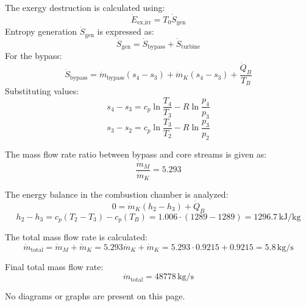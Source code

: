 The exergy destruction is calculated using:  
\[
\dot{E}_{\text{ex,irr}} = T_0 \dot{S}_{\text{gen}}
\]  
Entropy generation \( \dot{S}_{\text{gen}} \) is expressed as:  
\[
\dot{S}_{\text{gen}} = \dot{S}_{\text{bypass}} + \dot{S}_{\text{turbine}}
\]  
For the bypass:  
\[
\dot{S}_{\text{bypass}} = \dot{m}_{\text{bypass}} (s_4 - s_3) + \dot{m}_K (s_4 - s_3) + \frac{\dot{Q}_B}{T_B}
\]  
Substituting values:  
\[
s_4 - s_3 = c_p \ln \frac{T_4}{T_3} - R \ln \frac{p_4}{p_3}
\]  
\[
s_3 - s_2 = c_p \ln \frac{T_3}{T_2} - R \ln \frac{p_3}{p_2}
\]

The mass flow rate ratio between bypass and core streams is given as:  
\[
\frac{\dot{m}_M}{\dot{m}_K} = 5.293
\]  

The energy balance in the combustion chamber is analyzed:  
\[
0 = \dot{m}_K (h_2 - h_3) + \dot{Q}_B
\]  
\[
h_2 - h_3 = c_p (T_2 - T_3) - c_p (T_B) = 1.006 \cdot (1289 - 1289) = 1296.7 \, \text{kJ/kg}
\]  

The total mass flow rate is calculated:  
\[
\dot{m}_\text{total} = \dot{m}_M + \dot{m}_K = 5.293 \dot{m}_K + \dot{m}_K = 5.293 \cdot 0.9215 + 0.9215 = 5.8 \, \text{kg/s}
\]  

Final total mass flow rate:  
\[
\dot{m}_\text{total} = 48778 \, \text{kg/s}
\]  

No diagrams or graphs are present on this page.